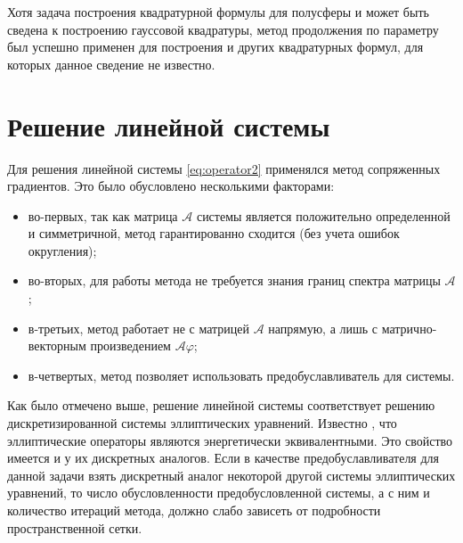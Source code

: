 Хотя задача построения квадратурной формулы для полусферы и может быть сведена к построению гауссовой квадратуры, метод продолжения по параметру был успешно применен для построения и других квадратурных формул, для которых данное сведение не известно.


\section{Решение линейной системы}

Для решения линейной системы \eqref{eq:operator2} применялся метод сопряженных градиентов. Это было обусловлено несколькими факторами:
\begin{itemize}
\item во-первых, так как матрица  $\mathcal A$ системы является положительно определенной и симметричной, метод гарантированно сходится (без учета ошибок округления);
\item во-вторых, для работы метода не требуется знания границ спектра матрицы  $\mathcal A$;
\item в-третьих, метод работает не с матрицей $\mathcal A$ напрямую, а лишь с матрично-векторным произведением  $\mathcal{A} \varphi$;
\item в-четвертых, метод позволяет использовать предобуславливатель для системы.
\end{itemize}

Как было отмечено выше, решение линейной системы соответствует решению дискретизированной системы эллиптических уравнений. Известно \cite{samarskiy1977,fedorenko1994}, что эллиптические операторы являются энергетически эквивалентными. Это свойство имеется и у их дискретных аналогов. Если в качестве предобуславливателя для данной задачи взять дискретный аналог некоторой другой системы эллиптических уравнений, то число обусловленности предобусловленной системы, а с ним и количество итераций метода, должно слабо зависеть от подробности пространственной сетки.

